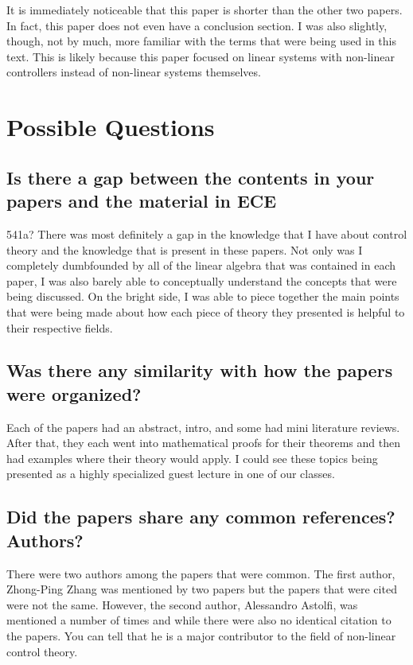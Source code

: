 \documentclass{IEEEtran}
\begin{document}
It is immediately noticeable that this paper is shorter than the other two
papers. In fact, this paper does not even have a conclusion section. I was also slightly, though, not by much, more familiar with the terms that were being used in this text. This is likely because this paper focused on linear systems with non-linear controllers instead of non-linear systems themselves.






\section{Possible Questions}

\subsection{Is there a gap between the contents in your papers and the material in ECE}
   541a?
There was most definitely a gap in the knowledge that I have about control theory and the knowledge that is present in these papers. Not only was I completely dumbfounded by all of the linear algebra that was contained in each paper, I was also barely able to conceptually understand the concepts that were being discussed. On the bright side, I was able to piece together the main points that were being made about how each piece of theory they presented is helpful to their respective fields.



\subsection{Was there any similarity with how the papers were organized?}
Each of the papers had an abstract, intro, and some had mini literature reviews. After that, they each went into mathematical proofs for their theorems and then had examples where their theory would apply. I could see these topics being presented as a highly specialized guest lecture in one of our classes.


\subsection{Did the papers share any common references? Authors?}
There were two authors among the papers that were common. The first author, Zhong-Ping Zhang was mentioned by two papers but the papers that were cited were not the same. However, the second author, Alessandro Astolfi, was mentioned a number of times and while there were also no identical citation to the papers. You can tell that he is a major contributor to the field of non-linear control theory.
\end{document}
